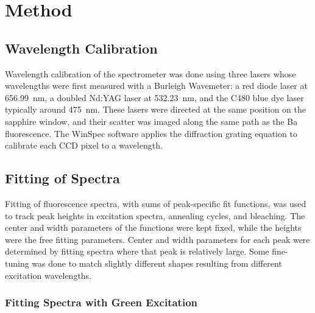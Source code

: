 \chapter{Method}

\section{Wavelength Calibration}

Wavelength calibration of the spectrometer was done using three lasers whose wavelengths were first measured with a Burleigh Wavemeter:  a red diode laser at 656.99~nm, a doubled Nd:YAG laser at 532.23~nm, and the C480 blue dye laser typically around 475~nm.  These lasers were directed at the same position on the sapphire window, and their scatter was imaged along the same path as the Ba fluorescence.  The WinSpec software applies the diffraction grating equation to calibrate each CCD pixel to a wavelength.

\section{Fitting of Spectra}
\label{sec:fitting}

Fitting of fluorescence spectra, with sums of peak-specific fit functions, was used to track peak heights in excitation spectra, annealing cycles, and bleaching.  The center and width parameters of the functions were kept fixed, while the heights were the free fitting parameters.  Center and width parameters for each peak were determined by fitting spectra where that peak is relatively large.  Some fine-tuning was done to match slightly different shapes resulting from different excitation wavelengths.

\subsection{Fitting Spectra with Green Excitation}
\label{subsec:fitgrn}

